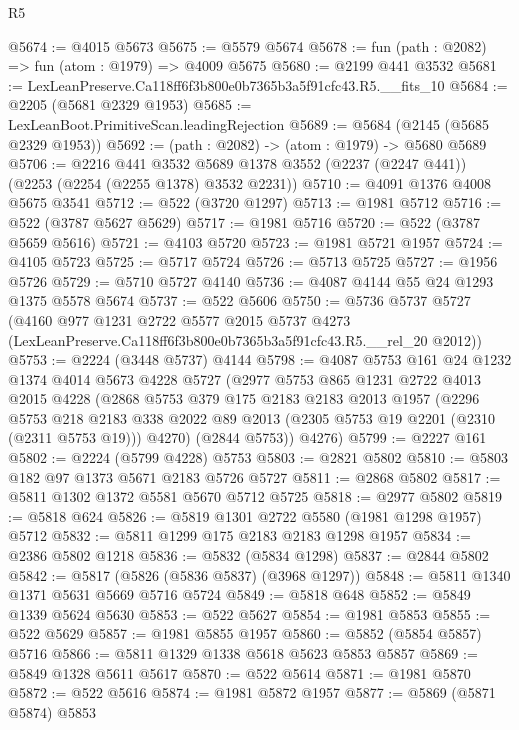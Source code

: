 \begin{lexlean}{R5}
\begin{coremodule}
@5674 := @4015 @5673
@5675 := @5579 @5674
@5678 := fun (path : @2082) => fun (atom : @1979) => @4009 @5675
@5680 := @2199 @441 @3532
@5681 := LexLeanPreserve.Ca118ff6f3b800e0b7365b3a5f91cfc43.R5.__fits_10
@5684 := @2205 (@5681 @2329 @1953)
@5685 := LexLeanBoot.PrimitiveScan.leadingRejection
@5689 := @5684 (@2145 (@5685 @2329 @1953))
@5692 := (path : @2082) -> (atom : @1979) -> @5680 @5689
@5706 := @2216
    @441
    @3532
    @5689
    @1378
    @3552
    (@2237 (@2247 @441))
    (@2253 (@2254 (@2255 @1378) @3532 @2231))
@5710 := @4091 @1376 @4008 @5675 @3541
@5712 := @522 (@3720 @1297)
@5713 := @1981 @5712
@5716 := @522 (@3787 @5627 @5629)
@5717 := @1981 @5716
@5720 := @522 (@3787 @5659 @5616)
@5721 := @4103 @5720
@5723 := @1981 @5721 @1957
@5724 := @4105 @5723
@5725 := @5717 @5724
@5726 := @5713 @5725
@5727 := @1956 @5726
@5729 := @5710 @5727 @4140
@5736 := @4087 @4144 @55 @24 @1293 @1375 @5578 @5674
@5737 := @522 @5606
@5750 := @5736
    @5737
    @5727
    (@4160
      @977
      @1231
      @2722
      @5577
      @2015
      @5737
      @4273
      (LexLeanPreserve.Ca118ff6f3b800e0b7365b3a5f91cfc43.R5.__rel_20 @2012))
@5753 := @2224 (@3448 @5737) @4144
@5798 := @4087
    @5753
    @161
    @24
    @1232
    @1374
    @4014
    @5673
    @4228
    @5727
    (@2977
      @5753
      @865
      @1231
      @2722
      @4013
      @2015
      @4228
      (@2868
        @5753
        @379
        @175
        @2183
        @2183
        @2013
        @1957
        (@2296
          @5753
          @218
          @2183
          @338
          @2022
          @89
          @2013
          (@2305 @5753 @19 @2201 (@2310 (@2311 @5753 @19)))
          @4270)
        (@2844 @5753))
      @4276)
@5799 := @2227 @161
@5802 := @2224 (@5799 @4228) @5753
@5803 := @2821 @5802
@5810 := @5803 @182 @97 @1373 @5671 @2183 @5726 @5727
@5811 := @2868 @5802
@5817 := @5811 @1302 @1372 @5581 @5670 @5712 @5725
@5818 := @2977 @5802
@5819 := @5818 @624
@5826 := @5819 @1301 @2722 @5580 (@1981 @1298 @1957) @5712
@5832 := @5811 @1299 @175 @2183 @2183 @1298 @1957
@5834 := @2386 @5802 @1218
@5836 := @5832 (@5834 @1298)
@5837 := @2844 @5802
@5842 := @5817 (@5826 (@5836 @5837) (@3968 @1297))
@5848 := @5811 @1340 @1371 @5631 @5669 @5716 @5724
@5849 := @5818 @648
@5852 := @5849 @1339 @5624 @5630
@5853 := @522 @5627
@5854 := @1981 @5853
@5855 := @522 @5629
@5857 := @1981 @5855 @1957
@5860 := @5852 (@5854 @5857) @5716
@5866 := @5811 @1329 @1338 @5618 @5623 @5853 @5857
@5869 := @5849 @1328 @5611 @5617
@5870 := @522 @5614
@5871 := @1981 @5870
@5872 := @522 @5616
@5874 := @1981 @5872 @1957
@5877 := @5869 (@5871 @5874) @5853

\end{coremodule}
\end{lexlean}
